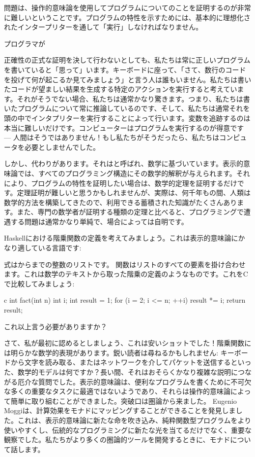 問題は、操作的意味論を使用してプログラムについてのことを証明するのが非常に難しいということです。プログラムの特性を示すためには、基本的に理想化されたインタープリターを通して「実行」しなければなりません。

プログラマが

正確性の正式な証明を決して行わないとしても、私たちは常に正しいプログラムを書いていると「思って」います。キーボードに座って、「さて、数行のコードを投げて何が起こるか見てみましょう」と言う人は誰もいません。私たちは書いたコードが望ましい結果を生成する特定のアクションを実行すると考えています。それがそうでない場合、私たちは通常かなり驚きます。つまり、私たちは書いたプログラムについて常に推論しているのです、そして、私たちは通常それを頭の中でインタプリターを実行することによって行います。変数を追跡するのは本当に難しいだけです。コンピューターはプログラムを実行するのが得意です --- 人間はそうではありません！もし私たちがそうだったら、私たちはコンピュータを必要としませんでした。

しかし、代わりがあります。それはと呼ばれ、数学に基づいています。表示的意味論では、すべてのプログラミング構造にその数学的解釈が与えられます。それにより、プログラムの特性を証明したい場合は、数学的定理を証明するだけです。定理証明が難しいと思うかもしれませんが、実際は、何千年もの間、人類は数学的方法を構築してきたので、利用できる蓄積された知識がたくさんあります。また、専門の数学者が証明する種類の定理と比べると、プログラミングで遭遇する問題は通常かなり単純で、場合によっては自明です。

Haskellにおける階乗関数の定義を考えてみましょう。これは表示的意味論にかなり適している言語です: 

式\code{{[}1..n{]}}はからまでの整数のリストです。
関数はリストのすべての要素を掛け合わせます。これは数学のテキストから取った階乗の定義のようなものです。これをCで比較してみましょう: 

\begin{snip}{c}
int fact(int n) {
    int i;
    int result = 1;
    for (i = 2; i <= n; ++i)
        result *= i;
    return result;
}
\end{snip}
これ以上言う必要がありますか？

さて、私が最初に認めるとしましょう、これは安いショットでした！階乗関数には明らかな数学的表現があります。鋭い読者は尋ねるかもしれません: キーボードから文字を読み取る、またはネットワークを介してパケットを送信するといった、数学的モデルは何ですか？長い間、それはおそらくかなり複雑な説明につながる厄介な質問でした。表示的意味論は、便利なプログラムを書くために不可欠な多くの重要なタスクに最適ではないようであり、それらは操作的意味論によって簡単に取り組むことができました。突破口は圏論から来ました。
Eugenio Moggiは、計算効果をモナドにマッピングすることができることを発見しました。これは、表示的意味論に新たな命を吹き込み、純粋関数型プログラムをより使いやすくし、伝統的なプログラミングに新たな光を当てるだけでなく、重要な観察でした。私たちがより多くの圏論的ツールを開発するときに、モナドについて話します。

